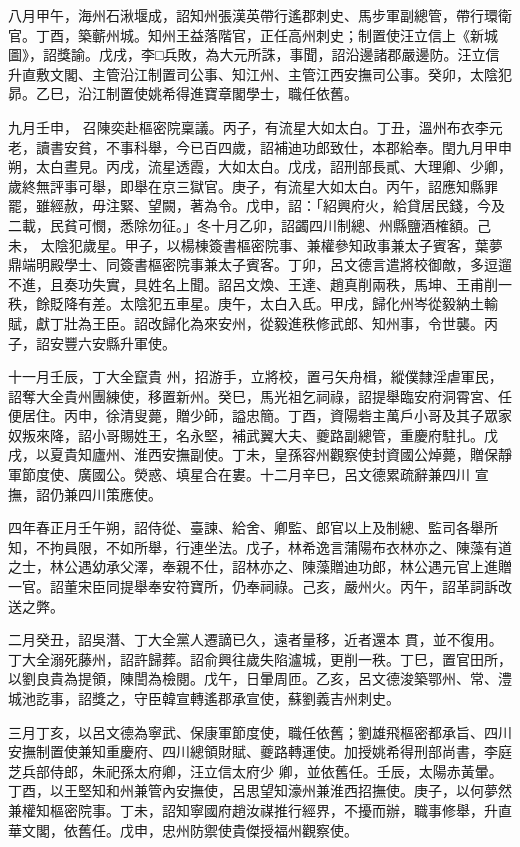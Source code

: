 \begin{pinyinscope}
 八月甲午，海州石湫堰成，詔知州張漢英帶行遙郡刺史、馬步軍副總管，帶行環衛官。丁酉，築蘄州城。知州王益落階官，正任高州刺史；制置使汪立信上《新城圖》，詔獎諭。戊戌，李□兵敗，為大元所誅，事聞，詔沿邊諸郡嚴邊防。汪立信升直敷文閣、主管沿江制置司公事、知江州、主管江西安撫司公事。癸卯，太陰犯昴。乙巳，沿江制置使姚希得進寶章閣學士，職任依舊。



 九月壬申，
 召陳奕赴樞密院稟議。丙子，有流星大如太白。丁丑，溫州布衣李元老，讀書安貧，不事科舉，今已百四歲，詔補迪功郎致仕，本郡給奉。閏九月甲申朔，太白晝見。丙戌，流星透霞，大如太白。戊戌，詔刑部長貳、大理卿、少卿，歲終無評事可舉，即舉在京三獄官。庚子，有流星大如太白。丙午，詔應知縣罪罷，雖經赦，毋注緊、望闕，著為令。戊申，詔：「紹興府火，給貸居民錢，今及二載，民貧可憫，悉除勿征。」冬十月乙卯，詔蠲四川制總、州縣鹽酒榷額。己未，
 太陰犯歲星。甲子，以楊棟簽書樞密院事、兼權參知政事兼太子賓客，葉夢鼎端明殿學士、同簽書樞密院事兼太子賓客。丁卯，呂文德言遣將校御敵，多逗遛不進，且奏功失實，具姓名上聞。詔呂文煥、王達、趙真削兩秩，馬坤、王甫削一秩，餘貶降有差。太陰犯五車星。庚午，太白入氐。甲戌，歸化州岑從毅納土輸賦，獻丁壯為王臣。詔改歸化為來安州，從毅進秩修武郎、知州事，令世襲。丙子，詔安豐六安縣升軍使。



 十一月壬辰，丁大全竄貴
 州，招游手，立將校，置弓矢舟楫，縱僕隸淫虐軍民，詔奪大全貴州團練使，移置新州。癸巳，馬光祖乞祠祿，詔提舉臨安府洞霄宮、任便居住。丙申，徐清叟薨，贈少師，謚忠簡。丁酉，資陽砦主萬戶小哥及其子眾家奴叛來降，詔小哥賜姓王，名永堅，補武翼大夫、夔路副總管，重慶府駐扎。戊戌，以夏貴知廬州、淮西安撫副使。丁未，皇孫容州觀察使封資國公焯薨，贈保靜軍節度使、廣國公。熒惑、填星合在婁。十二月辛巳，呂文德累疏辭兼四川
 宣撫，詔仍兼四川策應使。



 四年春正月壬午朔，詔侍從、臺諫、給舍、卿監、郎官以上及制總、監司各舉所知，不拘員限，不如所舉，行連坐法。戊子，林希逸言蒲陽布衣林亦之、陳藻有道之士，林公遇幼承父澤，奉親不仕，詔林亦之、陳藻贈迪功郎，林公遇元官上進贈一官。詔董宋臣同提舉奉安符寶所，仍奉祠祿。己亥，嚴州火。丙午，詔革詞訴改送之弊。



 二月癸丑，詔吳潛、丁大全黨人遷謫已久，遠者量移，近者還本
 貫，並不復用。丁大全溺死藤州，詔許歸葬。詔俞興往歲失陷瀘城，更削一秩。丁巳，置官田所，以劉良貴為提領，陳誾為檢閱。戊午，日暈周匝。乙亥，呂文德浚築鄂州、常、澧城池訖事，詔獎之，守臣韓宣轉遙郡承宣使，蘇劉義吉州刺史。



 三月丁亥，以呂文德為寧武、保康軍節度使，職任依舊；劉雄飛樞密都承旨、四川安撫制置使兼知重慶府、四川總領財賦、夔路轉運使。加授姚希得刑部尚書，李庭芝兵部侍郎，朱祀孫太府卿，汪立信太府少
 卿，並依舊任。壬辰，太陽赤黃暈。丁酉，以王堅知和州兼管內安撫使，呂思望知濠州兼淮西招撫使。庚子，以何夢然兼權知樞密院事。丁未，詔知寧國府趙汝禖推行經界，不擾而辦，職事修舉，升直華文閣，依舊任。戊申，忠州防禦使貴傑授福州觀察使。




\end{pinyinscope}
